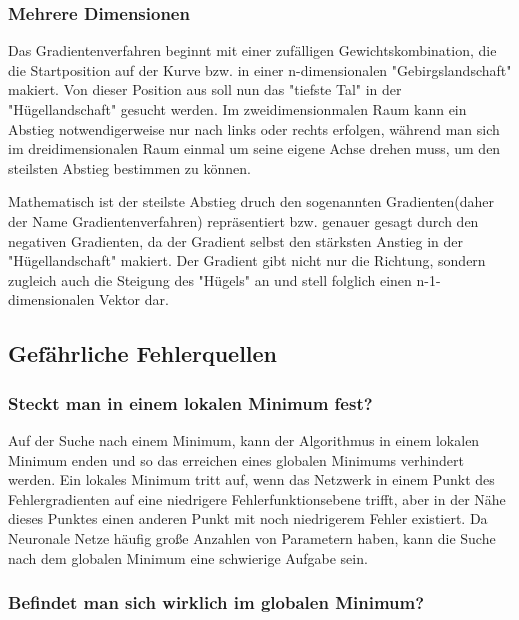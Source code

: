 \subsubsection{Mehrere Dimensionen}\label{subsec:gradientenverfahren:mehrere_dimensionen}
  Das Gradientenverfahren beginnt mit einer zufälligen Gewichtskombination, die die Startposition auf der Kurve bzw. in einer n-dimensionalen "Gebirgslandschaft" makiert.
  Von dieser Position aus soll nun das "tiefste Tal" in der "Hügellandschaft" gesucht werden.
  Im zweidimensionmalen Raum kann ein Abstieg notwendigerweise nur nach links oder rechts erfolgen, während man sich im dreidimensionalen Raum einmal um seine eigene Achse drehen muss,
  um den steilsten Abstieg bestimmen zu können.

  Mathematisch ist der steilste Abstieg druch den sogenannten Gradienten(daher der Name Gradientenverfahren) repräsentiert bzw. genauer gesagt durch den negativen Gradienten, da der 
  Gradient selbst den stärksten Anstieg in der "Hügellandschaft" makiert. Der Gradient gibt nicht nur die Richtung, sondern zugleich auch die Steigung des "Hügels" an und stell folglich
  einen n-1-dimensionalen Vektor dar.\cite{GR10}


\subsection{Gefährliche Fehlerquellen}\label{subsec:gradientenverfahren:fehlerquellen}
\subsubsection{Steckt man in einem lokalen Minimum fest?}\label{subsec:gradientenverfahren:fehlerquellen_lokalen_minimum}
  Auf der Suche nach einem Minimum, kann der Algorithmus in einem lokalen Minimum enden und so das erreichen eines globalen Minimums verhindert werden.
  Ein lokales Minimum tritt auf, wenn das Netzwerk in einem Punkt des Fehlergradienten auf eine niedrigere Fehlerfunktionsebene trifft, aber in der Nähe dieses Punktes einen anderen Punkt mit noch niedrigerem Fehler existiert.
  Da Neuronale Netze häufig große Anzahlen von Parametern haben, kann die Suche nach dem globalen Minimum eine schwierige Aufgabe sein.\cite{HS97}

\subsubsection{Befindet man sich wirklich im globalen Minimum?}\label{subsec:gradientenverfahren:fehlerquellen_globalen_minimum}

